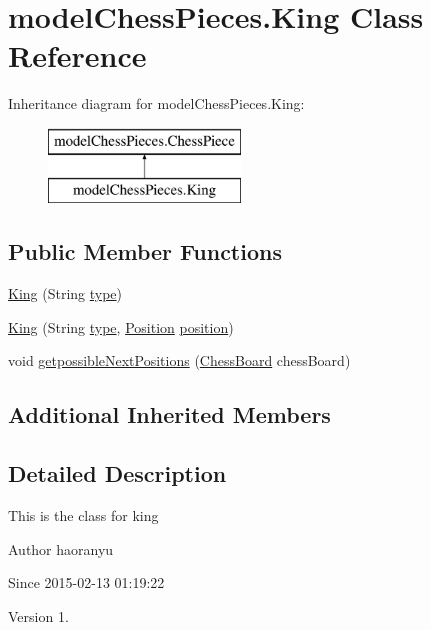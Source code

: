 \hypertarget{classmodel_chess_pieces_1_1_king}{\section{model\+Chess\+Pieces.\+King Class Reference}
\label{classmodel_chess_pieces_1_1_king}
}
Inheritance diagram for model\+Chess\+Pieces.\+King\+:\begin{figure}[H]
\begin{center}
\leavevmode
\includegraphics[height=2.000000cm]{classmodel_chess_pieces_1_1_king}
\end{center}
\end{figure}
\subsection*{Public Member Functions}
\begin{DoxyCompactItemize}
\item 
\hyperlink{classmodel_chess_pieces_1_1_king_addca0068eced10beccbb62407358e10a}{King} (String \hyperlink{classmodel_chess_pieces_1_1_chess_piece_a195487ca88c197af7c1604247be31db2}{type})
\item 
\hyperlink{classmodel_chess_pieces_1_1_king_a304e8f6364f887674d05a98e7a6f3ea1}{King} (String \hyperlink{classmodel_chess_pieces_1_1_chess_piece_a195487ca88c197af7c1604247be31db2}{type}, \hyperlink{classmodel_core_1_1_position}{Position} \hyperlink{classmodel_chess_pieces_1_1_chess_piece_a3d4362d5b28f6edb14161196d9c6807d}{position})
\item 
void \hyperlink{classmodel_chess_pieces_1_1_king_a2e7719a816495c0fae7188c3d96a2213}{getpossible\+Next\+Positions} (\hyperlink{classmodel_core_1_1_chess_board}{Chess\+Board} chess\+Board)
\end{DoxyCompactItemize}
\subsection*{Additional Inherited Members}


\subsection{Detailed Description}
This is the class for king \begin{DoxyAuthor}{Author}
haoranyu 
\end{DoxyAuthor}
\begin{DoxySince}{Since}
2015-\/02-\/13 01\+:19\+:22 
\end{DoxySince}
\begin{DoxyVersion}{Version}
1. 
\end{DoxyVersion}


